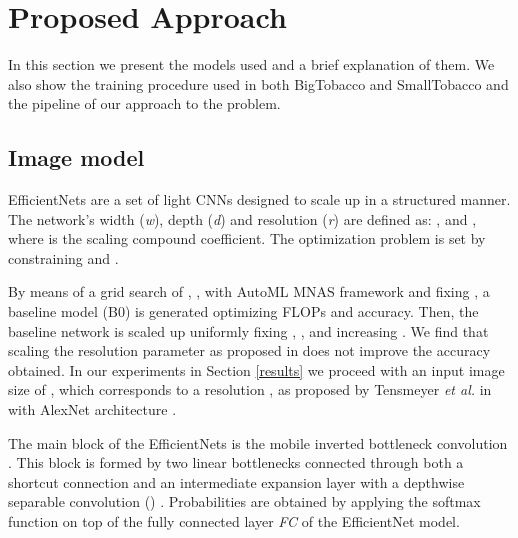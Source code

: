 \documentclass[runningheads]{llncs}
\begin{document}
\section{Proposed Approach}
In this section we present the models used and a brief explanation of them. We also show the training procedure used in both BigTobacco and SmallTobacco and the pipeline of our approach to the problem.



\subsection{Image model}\label{sec:image_model}

EfficientNets \cite{efficientnet} are a set of light CNNs designed to scale up in a structured manner. The network's width (\textit{w}), depth (\textit{d}) and resolution (\textit{r}) are defined as: ,  and , where  is the scaling compound coefficient. The optimization problem is set by constraining  and .

By means of a grid search of , ,  with AutoML MNAS framework \cite{mnasnet} and fixing , a baseline model (B0) is generated optimizing FLOPs and accuracy. Then, the baseline network is scaled up uniformly fixing , ,  and increasing . We find that scaling the resolution parameter as proposed in \cite{efficientnet} does not improve the accuracy obtained. In our experiments in Section \ref{results} we proceed with an input image size of , which corresponds to a resolution , as proposed by Tensmeyer \textit{et al.} in \cite{CNNs_analysis} with AlexNet architecture \cite{AlexNet}.

The main block of the EfficientNets is the mobile inverted bottleneck convolution \cite{mobilenetv2,mnasnet}. This block is formed by two linear bottlenecks connected through both a shortcut connection and an intermediate expansion layer with a depthwise separable convolution () \cite{depthwise}.
Probabilities  are obtained by applying the softmax function on top of the fully connected layer \textit{FC} of the EfficientNet model.

\begin{comment}
\begin{figure}
	\begin{centering}
	\texttt{[image: figures/inverted\_residual\_block.pdf]}
	\caption{Mobile inverted bottleneck block.}
	\label{fig:residual_block}
	\end{centering}
\end{figure}
\end{comment}
\end{document}
